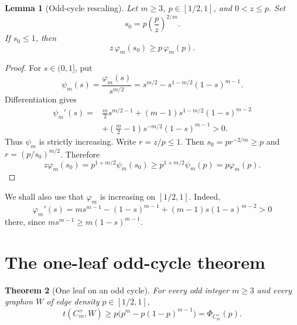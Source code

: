 \documentclass[11pt]{article}
\newtheorem{theorem}{Theorem}[section]
\newtheorem{lemma}[theorem]{Lemma}
\begin{document}
\begin{lemma}[Odd-cycle rescaling]\label{lem:scalar}
Let $m\geq3$, $p\in[1/2,1]$, and $0<z\leq p$.  Set
\[
 s_0=p\left(\frac pz\right)^{2/m}.
\]
If $s_0\leq1$, then
\[
 z\,\varphi_m(s_0)\geq p\,\varphi_m(p).
\]
\end{lemma}

\begin{proof}
For $s\in(0,1]$, put
\[
 \psi_m(s)=\frac{\varphi_m(s)}{s^{m/2}}
 =s^{m/2}-s^{1-m/2}(1-s)^{m-1}.
\]
Differentiation gives
\begin{align*}
 \psi_m'(s)={}&\frac m2s^{m/2-1}
 +(m-1)s^{1-m/2}(1-s)^{m-2}\\
 &+\left(\frac m2-1\right)s^{-m/2}(1-s)^{m-1}>0.
\end{align*}
Thus $\psi_m$ is strictly increasing.  Write $r=z/p\leq1$.  Then
$s_0=pr^{-2/m}\geq p$ and $r=(p/s_0)^{m/2}$.  Therefore
\[
 z\varphi_m(s_0)
 =p^{1+m/2}\psi_m(s_0)
 \geq p^{1+m/2}\psi_m(p)
 =p\varphi_m(p).
\]
\end{proof}

We shall also use that $\varphi_m$ is increasing on $[1/2,1]$.  Indeed,
\[
 \varphi_m'(s)
 =ms^{m-1}-(1-s)^{m-1}
 +(m-1)s(1-s)^{m-2}>0
\]
there, since $ms^{m-1}\geq m(1-s)^{m-1}$.


\section{The one-leaf odd-cycle theorem}

\begin{theorem}[One leaf on an odd cycle]\label{thm:main}
For every odd integer $m\geq3$ and every graphon $W$ of edge density
$p\in[1/2,1]$,
\[
 \boxed{
 t(C_m^+,W)
 \geq p\bigl(p^m-p(1-p)^{m-1}\bigr)
 =\Phi_{C_m^+}(p).
 }
\]
\end{theorem}
\end{document}
